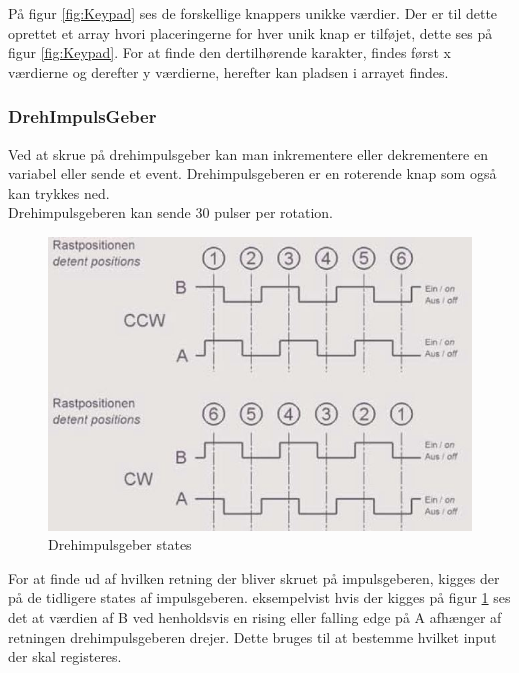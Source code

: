 På figur \ref{fig:Keypad} ses de forskellige knappers unikke værdier. Der er til dette oprettet et array hvori placeringerne for hver unik knap er tilføjet, dette ses på figur \ref{fig:Keypad}. For at finde den dertilhørende karakter, findes først x værdierne og derefter y værdierne, herefter kan pladsen i arrayet findes.
\\


\subsubsection{DrehImpulsGeber}

Ved at skrue på drehimpulsgeber kan man inkrementere eller dekrementere en variabel eller sende et event.
Drehimpulsgeberen er en roterende knap som også kan trykkes ned.\\
Drehimpulsgeberen kan sende 30 pulser per rotation.

\begin{figure}[ht]
			\begin{center}
			\includegraphics[scale=0.40]{Billeder/DrehImpulsGeber_events.jpg}
			\end{center}
			\caption{Drehimpulsgeber states}
			\label{fig:Impulsgeber}
		\end{figure}

For at finde ud af hvilken retning der bliver skruet på impulsgeberen, kigges der på de tidligere states af impulsgeberen.
eksempelvist hvis der kigges på figur \ref{fig:Impulsgeber} ses det at værdien af B ved henholdsvis en rising eller falling edge på A afhænger af retningen drehimpulsgeberen drejer. Dette bruges til at bestemme hvilket input der skal registeres.


